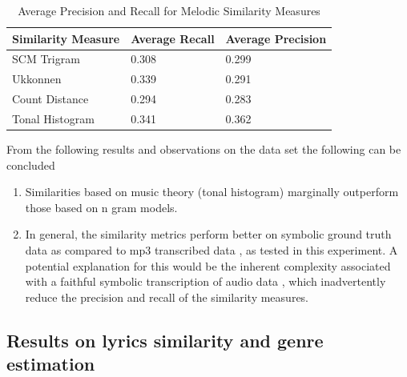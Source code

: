 \begin{table}[h]
\begin{center}
    \begin{tabular}{| l | l | l |}
    \hline
    Similarity Measure & Average Recall & Average Precision \\ \hline
    SCM Trigram & 0.308 & 0.299 \\ \hline
    Ukkonnen & 0.339 & 0.291 \\ \hline
    Count Distance & 0.294 & 0.283  \\ \hline
    Tonal Histogram & 0.341 & 0.362  \\ \hline
    \end{tabular}
\end{center}
\caption{Average Precision and Recall for Melodic Similarity Measures}
\end{table}

\noindent From the following results and observations on the data set the following can be concluded

\begin{enumerate}
\item Similarities based on music theory (tonal histogram) marginally outperform those based on n gram models. 
\item In general, the similarity metrics perform better on symbolic ground truth data \cite{mirexsym} as compared to mp3 transcribed data \cite{msd}, as tested in this experiment. A potential explanation for this would be the inherent complexity associated with a faithful symbolic transcription of audio data \cite{melextract}, which inadvertently reduce the precision and recall of the similarity measures. 
\end{enumerate}

\subsection{Results on lyrics similarity and genre estimation} \label{genrelabels}

